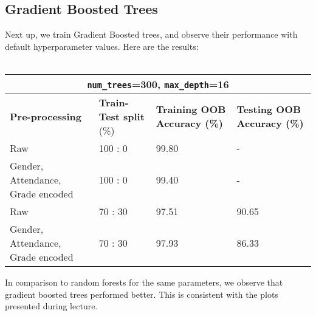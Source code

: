 \subsection{Gradient Boosted Trees}
Next up, we train Gradient Boosted trees, and observe their performance with default hyperparameter values. Here are the results:\\\\

\begin{tabular}{|p{4cm}||p{2 cm}||p{3cm}||p{3cm}|}
\hline
\multicolumn{4}{|c|}{\texttt{num\_trees}=300, \texttt{max\_depth}=16}\\
\hline
\textbf{Pre-processing} & \textbf{Train-Test split} (\%) &\textbf{Training OOB Accuracy (\%)} & \textbf{Testing OOB Accuracy (\%)} \\
\hline
Raw & 100 : 0& 99.80& -\\
\hline
Gender, Attendance, Grade encoded & 100 : 0  & 99.40&- \\
\hline
Raw & 70 : 30  & 97.51 & 90.65 \\
\hline
Gender, Attendance, Grade encoded & 70 : 30  & 97.93 & 86.33 \\
\hline
\end{tabular}\newline

In comparison to random forests for the same parameters, we observe that gradient boosted trees performed better. This is consistent with the plots presented during lecture.
